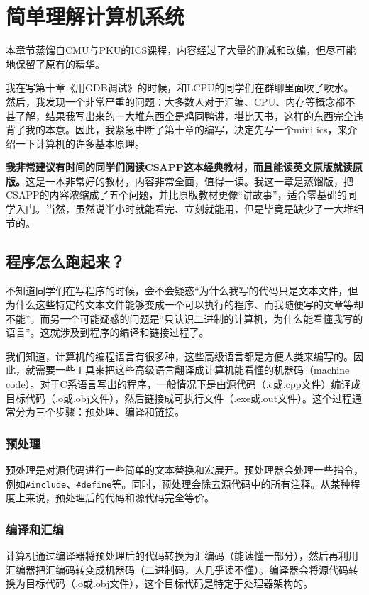 \chapter{简单理解计算机系统}

\begin{flushright}
本章节蒸馏自CMU与PKU的ICS课程，内容经过了大量的删减和改编，但尽可能地保留了原有的精华。
\end{flushright}

我在写第十章《用GDB调试》的时候，和LCPU的同学们在群聊里面吹了吹水。然后，我发现一个非常严重的问题：大多数人对于汇编、CPU、内存等概念都不甚了解，结果我写出来的一大堆东西全是鸡同鸭讲，堪比天书，这样的东西完全违背了我的本意。因此，我紧急中断了第十章的编写，决定先写一个mini ics，来介绍一下计算机的许多基本原理。

\textbf{我非常建议有时间的同学们阅读CSAPP这本经典教材，而且能读英文原版就读原版。}这是一本非常好的教材，内容非常全面，值得一读。我这一章是蒸馏版，把CSAPP的内容浓缩成了五个问题，并比原版教材更像“讲故事”，适合零基础的同学入门。当然，虽然说半小时就能看完、立刻就能用，但是毕竟是缺少了一大堆细节的。

\section{程序怎么跑起来？}

不知道同学们在写程序的时候，会不会疑惑“为什么我写的代码只是文本文件，但为什么这些特定的文本文件能够变成一个可以执行的程序、而我随便写的文章等却不能”。而另一个可能疑惑的问题是“只认识二进制的计算机，为什么能看懂我写的语言”。这就涉及到程序的编译和链接过程了。

我们知道，计算机的编程语言有很多种，这些高级语言都是方便人类来编写的。因此，就需要一些工具来把这些高级语言翻译成计算机能看懂的机器码（machine code）。对于C系语言写出的程序，一般情况下是由源代码（.c或.cpp文件）编译成目标代码（.o或.obj文件），然后链接成可执行文件（.exe或.out文件）。这个过程通常分为三个步骤：预处理、编译和链接。

\subsection{预处理}
预处理是对源代码进行一些简单的文本替换和宏展开。预处理器会处理一些指令，例如\texttt{\#include}、\texttt{\#define}等。同时，预处理会除去源代码中的所有注释。从某种程度上来说，预处理后的代码和源代码完全等价。

\subsection{编译和汇编}
计算机通过编译器将预处理后的代码转换为汇编码（能读懂一部分），然后再利用汇编器把汇编码转变成机器码（二进制码，人几乎读不懂）。编译器会将源代码转换为目标代码（.o或.obj文件），这个目标代码是特定于处理器架构的。

